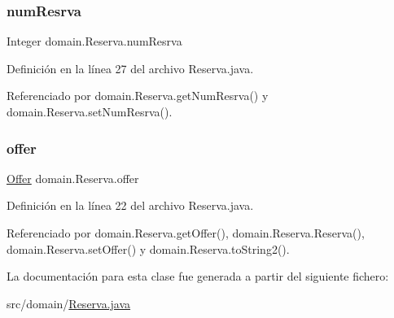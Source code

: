 \mbox{\label{classdomain_1_1_reserva_a27d9c46e38154c94ce6095a9bd60bbd3}} 
\subsubsection{\texorpdfstring{numResrva}{numResrva}}
{\footnotesize\ttfamily Integer domain.\+Reserva.\+num\+Resrva\hspace{0.3cm}{\ttfamily [private]}}



Definición en la línea 27 del archivo Reserva.\+java.



Referenciado por domain.\+Reserva.\+get\+Num\+Resrva() y domain.\+Reserva.\+set\+Num\+Resrva().

\mbox{\label{classdomain_1_1_reserva_a94a6ee6bd5c3aea150f3977c8a7cf1f0}} 
\subsubsection{\texorpdfstring{offer}{offer}}
{\footnotesize\ttfamily \mbox{\hyperlink{classdomain_1_1_offer}{Offer}} domain.\+Reserva.\+offer\hspace{0.3cm}{\ttfamily [private]}}



Definición en la línea 22 del archivo Reserva.\+java.



Referenciado por domain.\+Reserva.\+get\+Offer(), domain.\+Reserva.\+Reserva(), domain.\+Reserva.\+set\+Offer() y domain.\+Reserva.\+to\+String2().



La documentación para esta clase fue generada a partir del siguiente fichero\+:\begin{DoxyCompactItemize}
\item 
src/domain/\mbox{\hyperlink{_reserva_8java}{Reserva.\+java}}\end{DoxyCompactItemize}
